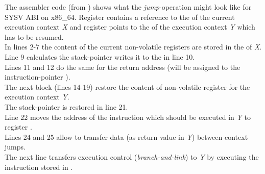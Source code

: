 \label{appendix}

The assembler code (from \boostcontext) shows what the \textit{jump}-operation
might look like for SYSV ABI on x86\_64.
Register  contains a reference to the \cblock of the current execution
context \textit{X} and register  points to the \cblock of the execution
context \textit{Y} which has to be resumed.\\
\newline
In lines 2-7 the content of the current non-volatile registers are stored in the
\cblock of \textit{X}.\\
Line 9 calculates the stack-pointer writes it to the \cblock in line 10.\\
Lines 11 and 12 do the same for the return address (will be assigned to the
instruction-pointer ).\\
\newline
The next block (lines 14-19) restore the content of non-volatile register for
the execution context \textit{Y}.\\
The stack-pointer is restored in line 21.\\
Line 22 moves the address of the instruction which should be executed in
\textit{Y} to register .\\
\newline
Lines 24 and 25 allow to transfer data (as return value in \textit{Y}) between
context jumps.\\
\newline
The next line transfers execution control (\textit{branch-and-link}) to
\textit{Y} by executing the instruction stored in .

